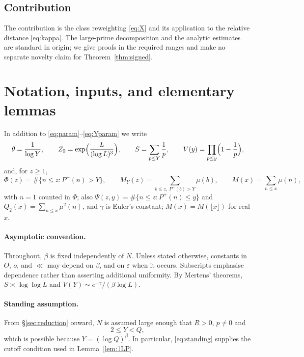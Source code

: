 \documentclass[11pt,a4paper]{article}
\theoremstyle{plain}
\theoremstyle{definition}
\theoremstyle{remark}
\newcommand{\Pp}{P^{+}}
\newcommand{\Pm}{P^{-}}
\newcommand{\eps}{\varepsilon}
\begin{document}
\subsection{Contribution}\label{sec:new}
The contribution is the class reweighting \eqref{eq:X} and its application to the relative distance
\eqref{eq:kappa}. The large-prime decomposition and the analytic estimates are standard in origin; we
give proofs in the required ranges and make no separate novelty claim for Theorem~\ref{thm:signed}.

\section{Notation, inputs, and elementary lemmas}\label{sec:setting}

In addition to \eqref{eq:param}--\eqref{eq:Yparam} we write
\begin{equation}\label{eq:more}
  \theta=\frac1{\log Y},\qquad
  Z_{0}=\exp\Bigl(\frac L{(\log L)^{3}}\Bigr),\qquad
  S=\sum_{p\le Y}\frac1p,\qquad V(y)=\prod_{p\le y}\Bigl(1-\frac1p\Bigr),
\end{equation}
and, for $z\ge1$,
\begin{equation}\label{eq:counts}
  \Phi(z)=\#\{n\le z:\Pm(n)>Y\},\qquad
  M_{Y}(z)=\!\!\sum_{b\le z,\ \Pm(b)>Y}\!\!\mu(b),\qquad
  M(x)=\sum_{n\le x}\mu(n),
\end{equation}
with $n=1$ counted in $\Phi$; also $\Psi(z,y)=\#\{n\le z:\Pp(n)\le y\}$ and
$Q_{2}(x)=\sum_{n\le x}\mu^{2}(n)$, and $\gamma$ is Euler's constant; $M(x)=M(\lfloor x\rfloor)$
for real $x$.

\paragraph{Asymptotic convention.}
Throughout, $\beta$ is fixed independently of $N$. Unless stated otherwise, constants in $O$,
$o$, and $\ll$ may depend on $\beta$, and on $\eps$ when it occurs. Subscripts emphasise dependence
rather than asserting additional uniformity. By Mertens' theorems,
$S\asymp\log\log L$ and $V(Y)\sim e^{-\gamma}/(\beta\log L)$.

\paragraph{Standing assumption.}
From \S\ref{sec:reduction} onward, $N$ is assumed large enough that $R>0$, $p\neq0$ and
\begin{equation}\label{eq:standing}
  2\le Y<Q ,
\end{equation}
which is possible because $Y=(\log Q)^{\beta}$. In particular, \eqref{eq:standing} supplies the cutoff condition used in Lemma~\ref{lem:1LP}.
\end{document}
